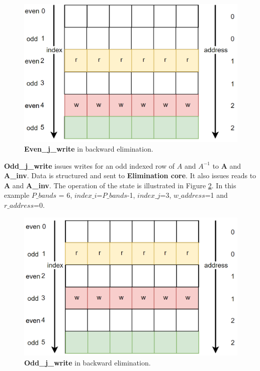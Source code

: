 \begin{figure}[H]
\centering
   \includegraphics[scale=0.3]{images/inverse_fsms/backward_elim/write_even_j.PNG}
  \caption{\textbf{Even\_j\_write} in backward elimination. } 
  \label{fig:backward_elim_even_indexed_j}
\end{figure}

\textbf{Odd\_j\_write} issues writes for an odd indexed row of $A$ and $A^{-1}$ to \textbf{A} and \textbf{A\_inv}. Data is structured and sent to \textbf{Elimination core}. It also issues reads to \textbf{A} and \textbf{A\_inv}. The operation of the state is illustrated in Figure \ref{fig:backward_elim_odd_indexed_j}. In this example $P\_bands$ = 6, $index\_i$=$P\_bands$-1, $index\_j$=3, $w\_address$=1 and $r\_address$=0. 

\begin{figure}[H]
\centering
   \includegraphics[scale=0.3]{images/inverse_fsms/backward_elim/write_odd_j.png}
  \caption{\textbf{Odd\_j\_write} in backward elimination. } 
  \label{fig:backward_elim_odd_indexed_j}
\end{figure}


